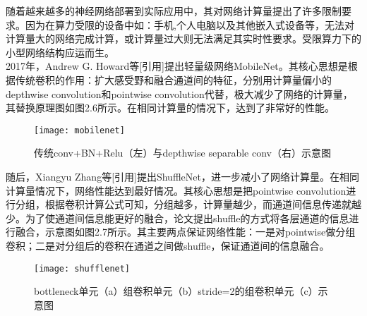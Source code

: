 随着越来越多的神经网络部署到实际应用中，其对网络计算量提出了许多限制要求。因为在算力受限的设备中如：手机,个人电脑以及其他嵌入式设备等，无法对计算量大的网络完成计算，或计算量过大则无法满足其实时性要求。受限算力下的小型网络结构应运而生。\\
2017年，Andrew G. Howard等[引用]提出轻量级网络MobileNet。其核心思想是根据传统卷积的作用：扩大感受野和融合通道间的特征，分别用计算量偏小的depthwise convolution和pointwise convolution代替，极大减少了网络的计算量，其替换原理图如图2.6所示。在相同计算量的情况下，达到了非常好的性能。\\
\begin{figure}[htp]
\centering
\texttt{[image: mobilenet]}
\caption{传统conv+BN+Relu（左）与depthwise separable conv（右）示意图}
\end{figure}
随后，Xiangyu Zhang等[引用]提出ShuffleNet，进一步减小了网络计算量。在相同计算量情况下，网络性能达到最好情况。其核心思想是把pointwise convolution进行分组，根据卷积计算公式可知，分组越多，计算量越少，而通道间信息传递就越少。为了使通道间信息能更好的融合，论文提出shuffle的方式将各层通道的信息进行融合，示意图如图2.7所示。其主要两点保证网络性能：一是对pointwise做分组卷积；二是对分组后的卷积在通道之间做shuffle，保证通道间的信息融合。\\
\begin{figure}[htp]
\centering
\texttt{[image: shufflenet]}
\caption{bottleneck单元（a）组卷积单元（b）stride=2的组卷积单元（c）示意图}
\end{figure}
